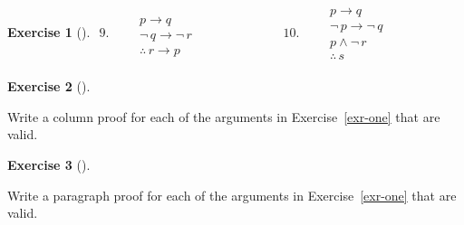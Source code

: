 \documentclass[
  letterpaper,
  10pt,
  reqno,
  twopage,
  openany]{book}
\theoremstyle{plain}
\theoremstyle{definition}
\newtheorem{exercise}{Exercise}[chapter]
\theoremstyle{definition}
\theoremstyle{definition}
\theoremstyle{plain}
\theoremstyle{plain}
\theoremstyle{remark}
\begin{document}
\begin{exercise}[]
\(\begin{array}{ll} 9. \qquad \begin{array}{l} \\ p\rightarrow q\\ \neg \, q \rightarrow \neg \, r \\ \hline \therefore \, r \rightarrow p \end{array} & \qquad \qquad \qquad 10. \qquad \begin{array}{l} p \rightarrow q \\ \neg \, p \rightarrow \neg \, q \\ p \land \neg \, r \\ \hline \therefore \, s \end{array} \end{array}\)

\end{exercise}

\leavevmode{}%
\begin{exercise}[]\label{exr-two}

Write a column proof for each of the arguments in Exercise~\ref{exr-one}
that are valid.

\end{exercise}

\leavevmode{}%
\begin{exercise}[]\label{exr-three}

Write a paragraph proof for each of the arguments in
Exercise~\ref{exr-one} that are valid.

\end{exercise}
\end{document}
